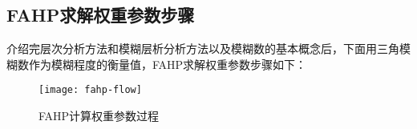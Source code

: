 \subsection{FAHP求解权重参数步骤}
介绍完层次分析方法和模糊层析分析方法以及模糊数的基本概念后，下面用三角模糊数作为模糊程度的衡量值，FAHP求解权重参数步骤如下：
\begin{figure}[H] %
	\centering
	\texttt{[image: fahp-flow]}
	\caption{FAHP计算权重参数过程}
	\label{fig:xfig1}
\end{figure}











